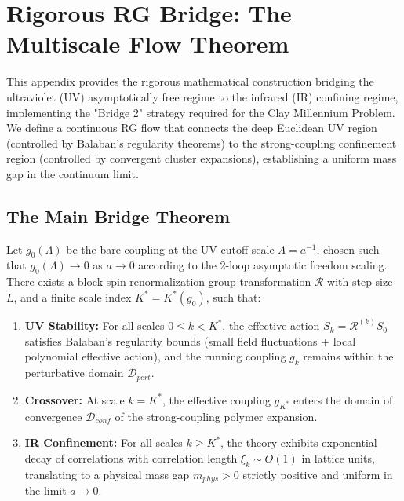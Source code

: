 \section{Rigorous RG Bridge: The Multiscale Flow Theorem}
\label{sec:rigorous-bridge}

This appendix provides the rigorous mathematical construction bridging the ultraviolet (UV) asymptotically free regime to the infrared (IR) confining regime, implementing the "Bridge 2" strategy required for the Clay Millennium Problem. We define a continuous RG flow that connects the deep Euclidean UV region (controlled by Balaban's regularity theorems) to the strong-coupling confinement region (controlled by convergent cluster expansions), establishing a uniform mass gap in the continuum limit.

\subsection{The Main Bridge Theorem}

\begin{theorem}
\label{thm:main_bridge}
Let $g_0(\Lambda)$ be the bare coupling at the UV cutoff scale $\Lambda = a^{-1}$, chosen such that $g_0(\Lambda) \to 0$ as $a \to 0$ according to the 2-loop asymptotic freedom scaling.
There exists a block-spin renormalization group transformation $\mathcal{R}$ with step size $L$, and a finite scale index $K^* = K^*(g_0)$, such that:
\begin{enumerate}
    \item \textbf{UV Stability:} For all scales $0 \le k < K^*$, the effective action $S_k = \mathcal{R}^{(k)} S_0$ satisfies Balaban's regularity bounds (small field fluctuations + local polynomial effective action), and the running coupling $g_k$ remains within the perturbative domain $\mathcal{D}_{pert}$.
    \item \textbf{Crossover:} At scale $k = K^*$, the effective coupling $g_{K^*}$ enters the domain of convergence $\mathcal{D}_{conf}$ of the strong-coupling polymer expansion.
    \item \textbf{IR Confinement:} For all scales $k \ge K^*$, the theory exhibits exponential decay of correlations with correlation length $\xi_k \sim O(1)$ in lattice units, translating to a physical mass gap $m_{phys} > 0$ strictly positive and uniform in the limit $a \to 0$.
\end{enumerate}
\end{theorem}


